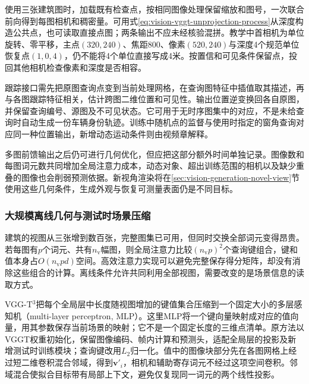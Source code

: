 使用三张建筑图时，加载既有检查点，按相同图像处理保留缩放和图号，一次联合前向得到每图相机和稠密量。可用式\eqref{eq:vision-vggt-unprojection-process}从深度构造公共点，也可读取直接点图；两条输出不应未经核验混拼。教学中首相机为单位旋转、零平移，主点$(320,240)$、焦距800、像素$(520,240)$与深度4个规范单位恢复点$(1,0,4)$，仍不能将4个单位直接写成4米。按置信和可见条件保留点，投回其他相机检查像素和深度是否相容。

跟踪接口需先把原图查询点变到当前处理网格，在查询图特征中插值取其描述，再与各图跟踪特征相关，估计跨图二维位置和可见性。输出位置逆变换回各自原图，并保留查询编号、源图及不可见状态。它可用于无时序图集中的对应，不是未给查询时自动生成一份车辆身份轨迹。训练中随机点的监督与使用时指定的窗角查询对应同一种位置输出，新增动态运动条件则由视频章解释。

多图前馈输出之后仍可进行几何优化，但应把这部分额外时间单独记录。图像数和每图词元数共同增加全局注意力成本，动态对象、超出训练范围的相机以及缺少重叠的图像也会削弱预测依据。新视角渲染将在\ref{sec:vision-generation-novel-view}节使用这些几何条件，生成外观与恢复可测量表面仍是不同目标。

\subsubsection{大规模离线几何与测试时场景压缩}
\label{sec:vision-recognition-vgg-t3}

建筑的视图从三张增到数百张，完整图集已可用，但同时交换全部词元变得昂贵。若每图有$p$个词元、共有$n_{\mathrm v}$幅图，则全局注意力比较$(n_{\mathrm v}p)^2$个查询键组合，键和值本身占$O(n_{\mathrm v}pd)$空间。高效注意力实现可以避免完整保存得分矩阵，却没有消除这些组合的计算。离线条件允许共同利用全部视图，需要改变的是场景信息的读取方式。

VGG-T$^3$把每个全局层中长度随视图增加的键值集合压缩到一个固定大小的多层感知机（multi-layer perceptron, MLP）。这里MLP将一个键向量映射成对应的值向量，用其参数保存当前场景的映射；它不是一个固定长度的三维点清单。原方法以VGGT权重初始化，保留图像编码、帧内计算和预测头，适配全局层的投影及新增测试时训练模块；查询键改用$L_2$归一化。值中的图像块部分先在各图网格上经过短二维卷积混合邻域，得到$\bm{v}'_i$，相机和辅助寄存词元不经过这项空间卷积。邻域混合使拟合目标带有局部上下文，避免仅复现同一词元的两个线性投影。

